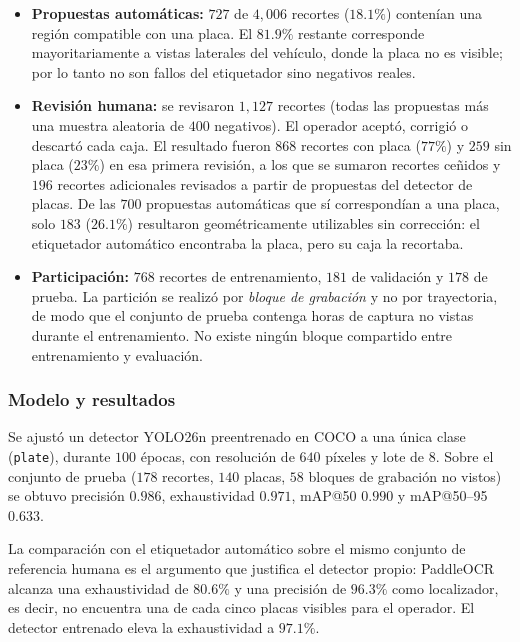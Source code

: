 \begin{itemize}
    \item \textbf{Propuestas automáticas:} $727$ de $4{,}006$ recortes ($18{.}1\%$)
        contenían una región compatible con una placa. El $81{.}9\%$ restante
        corresponde mayoritariamente a vistas laterales del vehículo, donde la
        placa no es visible; por lo tanto no son fallos del etiquetador sino
        negativos reales.
    \item \textbf{Revisión humana:} se revisaron $1{,}127$ recortes (todas las
        propuestas más una muestra aleatoria de $400$ negativos). El operador
        aceptó, corrigió o descartó cada caja. El resultado fueron $868$ recortes
        con placa ($77\%$) y $259$ sin placa ($23\%$) en esa primera revisión, a
        los que se sumaron recortes ceñidos y $196$ recortes adicionales revisados
        a partir de propuestas del detector de placas. De las $700$ propuestas
        automáticas que sí correspondían a una placa, solo $183$ ($26{.}1\%$)
        resultaron geométricamente utilizables sin corrección: el etiquetador
        automático encontraba la placa, pero su caja la recortaba.
    \item \textbf{Participación:} $768$ recortes de entrenamiento, $181$ de
        validación y $178$ de prueba. La partición se realizó por
        \emph{bloque de grabación} y no por trayectoria, de modo que el conjunto
        de prueba contenga horas de captura no vistas durante el entrenamiento.
        No existe ningún bloque compartido entre entrenamiento y evaluación.
\end{itemize}

\subsubsection{Modelo y resultados}

Se ajustó un detector YOLO26n preentrenado en COCO a una única clase
(\texttt{plate}), durante $100$ épocas, con resolución de $640$ píxeles y lote de
$8$. Sobre el conjunto de prueba ($178$ recortes, $140$ placas, $58$ bloques de
grabación no vistos) se obtuvo precisión $0{.}986$, exhaustividad $0{.}971$,
mAP@50 $0{.}990$ y mAP@50--95 $0{.}633$.

La comparación con el etiquetador automático sobre el mismo conjunto de
referencia humana es el argumento que justifica el detector propio: PaddleOCR
alcanza una exhaustividad de $80{.}6\%$ y una precisión de $96{.}3\%$ como
localizador, es decir, no encuentra una de cada cinco placas visibles para el
operador. El detector entrenado eleva la exhaustividad a $97{.}1\%$.

